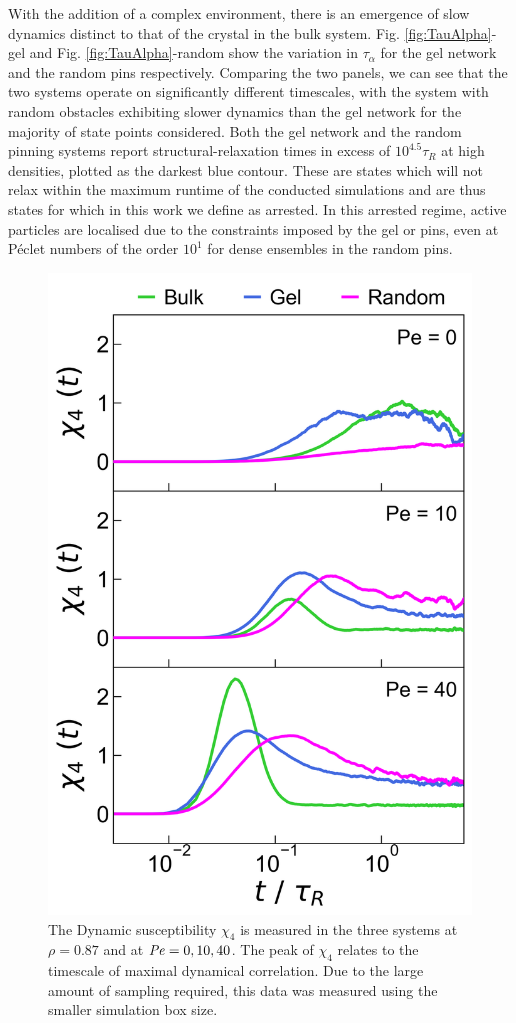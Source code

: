 With the addition of a complex environment, there is an emergence of slow dynamics distinct to that of the crystal in the bulk system. Fig. \ref{fig:TauAlpha}-gel and Fig. \ref{fig:TauAlpha}-random show the variation in $\tau_{\alpha}$ for the gel network and the random pins respectively.  Comparing the two panels, we can see that the two systems operate on significantly different timescales, with the system with random obstacles exhibiting slower dynamics than the gel network for the majority of state points considered. Both the gel network and the random pinning systems report structural-relaxation times in excess of $10^{4.5}\tau_R$ at high densities, plotted as the darkest blue contour. These are states which will not relax within the maximum runtime of the conducted simulations and are thus states for which in this work we define as arrested. In this arrested regime, active particles are localised due to the constraints imposed by the gel or pins, even at Péclet numbers of the order $10^1$ for dense ensembles in the random pins. 


\begin{figure}
	\centering
	\includegraphics[width=0.5\linewidth]{chapters/activeConfinement/figsActiveConfinement/figChi4.png}
	\caption[The Dynamic susceptibility in the bulk vs. in confinement]{The Dynamic susceptibility $\chi_4$ is measured in the three systems at $\rho = 0.87$ and at $\operatorname{\mathit{P\kern-.08em e}} = 0, 10, 40$. The peak of $\chi_4$ relates to the timescale of maximal dynamical correlation. Due to the large amount of sampling required, this data was measured using the smaller simulation box size.}
	\label{fig:chi4}
\end{figure}

